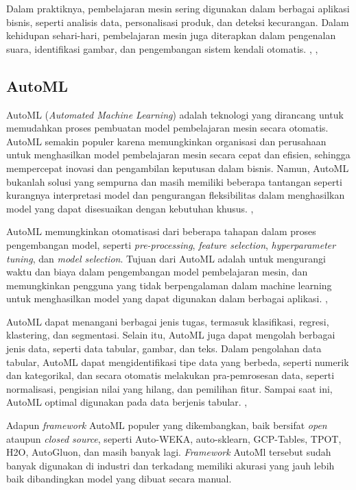 Dalam praktiknya, pembelajaran mesin sering digunakan dalam berbagai aplikasi bisnis, seperti analisis data, personalisasi produk, dan deteksi kecurangan.
Dalam kehidupan sehari-hari, pembelajaran mesin juga diterapkan dalam pengenalan suara, identifikasi gambar, dan pengembangan sistem kendali otomatis. \cite{jordan2015machine}, \cite{Alpaydin2014}, \cite{murphy2012machine}

\subsection{AutoML}
AutoML (\emph{Automated Machine Learning}) adalah teknologi yang dirancang untuk memudahkan proses pembuatan model pembelajaran mesin secara otomatis. AutoML
semakin populer karena memungkinkan organisasi dan perusahaan untuk menghasilkan model pembelajaran mesin secara cepat dan efisien, sehingga mempercepat
inovasi dan pengambilan keputusan dalam bisnis. Namun, AutoML bukanlah solusi yang sempurna dan masih memiliki beberapa tantangan seperti kurangnya
interpretasi model dan pengurangan fleksibilitas dalam menghasilkan model yang dapat disesuaikan dengan kebutuhan khusus. \cite{manashgoswami_2023},
\cite{singla_2020}

AutoML memungkinkan otomatisasi dari beberapa tahapan dalam proses pengembangan model, seperti \emph{pre-processing}, \emph{feature selection},
\emph{hyperparameter tuning}, dan \emph{model selection}. Tujuan dari AutoML adalah untuk mengurangi waktu dan biaya dalam pengembangan model pembelajaran
mesin, dan memungkinkan pengguna yang tidak berpengalaman dalam machine learning untuk menghasilkan model yang dapat digunakan dalam berbagai aplikasi.
\cite{manashgoswami_2023}, \cite{singla_2020}

AutoML dapat menangani berbagai jenis tugas, termasuk klasifikasi, regresi, klastering, dan segmentasi. Selain itu, AutoML juga dapat mengolah berbagai jenis
data, seperti data tabular, gambar, dan teks. Dalam pengolahan data tabular, AutoML dapat mengidentifikasi tipe data yang berbeda, seperti numerik dan
kategorikal, dan secara otomatis melakukan pra-pemrosesan data, seperti normalisasi, pengisian nilai yang hilang, dan pemilihan fitur. Sampai saat ini, AutoML
optimal digunakan pada data berjenis tabular. \cite{manashgoswami_2023}, \cite{singla_2020}

Adapun \emph{framework} AutoML populer yang dikembangkan, baik bersifat \emph{open} ataupun \emph{closed source}, seperti Auto-WEKA, auto-sklearn, GCP-Tables,
TPOT, H2O, AutoGluon, dan masih banyak lagi. \emph{Framework} AutoMl tersebut sudah banyak digunakan di industri dan terkadang memiliki akurasi yang jauh lebih
baik dibandingkan model yang dibuat secara manual. \cite{agtabular}

